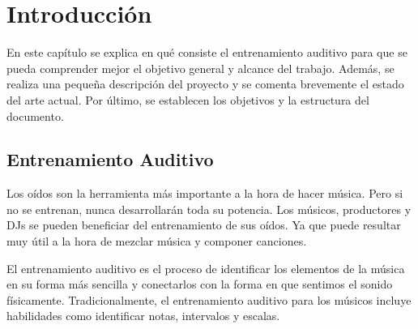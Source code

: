 \documentclass[12pt,twoside,titlepage]{report}
\begin{document}
  


\pagestyle{fancy}
\renewcommand{\chaptermark}[1]{\markboth{Capítulo \thechapter.\ #1}{}}
\pagestyle{fancy}
\fancyhf{}
\fancyhead[LO]{\leftmark}
\fancyhead[RO]{}
\fancyhead[RE]{\nouppercase\rightmark}
\fancyhead[LE]{}
\fancyfoot[C]{\thepage}


   


\chapter{Introducción}

En este capítulo se explica en qué consiste el entrenamiento auditivo para que se pueda comprender mejor el objetivo general y alcance del trabajo. Además, se realiza una pequeña descripción del proyecto y se comenta brevemente el estado del arte actual. Por último, se establecen los objetivos y la estructura del documento.

\pagestyle{fancy}

\setlength{\parskip}{0.75em}
\renewcommand{\baselinestretch}{1.25}


\setcounter{page}{1}

\section{Entrenamiento Auditivo}

Los oídos son la herramienta más importante a la hora de hacer música. Pero si no se entrenan, nunca desarrollarán toda su potencia. Los músicos, productores y DJs se pueden beneficiar del entrenamiento de sus oídos. Ya que puede resultar muy útil a la hora de mezclar música y componer canciones.

El entrenamiento auditivo es el proceso de identificar los elementos de la música en su forma más sencilla y conectarlos con la forma en que sentimos el sonido físicamente. Tradicionalmente, el entrenamiento auditivo para los músicos incluye habilidades como identificar notas, intervalos y escalas. 
\end{document}
